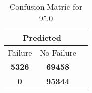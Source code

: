\begin{table}[] 
\caption{Confusion Matric for 95.0} 
\label{Table: Prediction Accuracy-DMD95.0OnlySunEKF-ignoreReflection500.9EKF-top2-Reflection} 
\centering 
\begin{tabular} 
 {@{}ccc@{}} 
\toprule 
\multicolumn{2}{c}{\textbf{Predicted}}
 \\ \midrule 
\multicolumn{1}{|c|}{Failure} & 
\multicolumn{1}{c|}{No Failure}
 \\ \midrule 
\multicolumn{1}{|c|}{\color{green}\textbf{5326}} & 
\multicolumn{1}{c|}{\color{red}\textbf{69458}}
 \\ \midrule 
\multicolumn{1}{|c|}{\color{red}\textbf{0}} & 
\multicolumn{1}{c|}{\color{green}\textbf{95344}}
 \\ \bottomrule 
\end{tabular} 
\end{table} 
